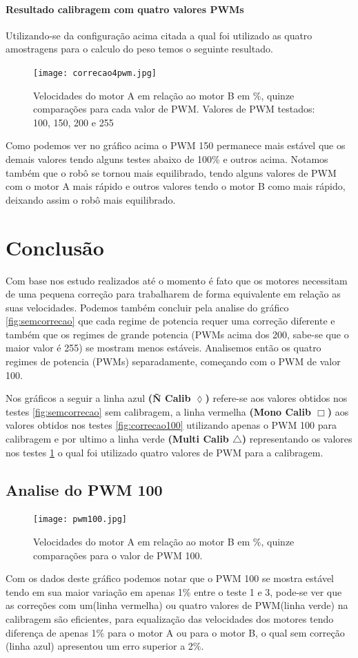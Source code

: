\documentclass[a4paper,12pt,portuguese]{ufms-cpcx}
\begin{document}
\subsubsection{Resultado calibragem com quatro valores PWMs}
Utilizando-se da configuração acima citada a qual foi utilizado as quatro amostragens para o calculo do peso temos o seguinte resultado.
\begin{figure}[H]	
	\centering
	\texttt{[image: correcao4pwm.jpg]}
	\caption{Velocidades do motor A em relação ao motor B em \%, quinze comparações para cada valor de PWM. Valores de PWM testados: 100, 150, 200 e 255}
	\label{fig:correcao4pwm}
\end{figure}
Como podemos ver no gráfico acima o PWM 150 permanece mais estável que os demais valores tendo alguns testes abaixo de 100\% e outros acima. Notamos também que o robô se tornou mais equilibrado, tendo alguns valores de PWM com o motor A mais rápido e outros valores tendo o motor B como mais rápido, deixando assim o robô mais equilibrado.

\chapter{Conclusão}
Com base nos estudo realizados até o momento é fato que os motores necessitam de uma pequena correção para trabalharem de forma equivalente em relação as suas velocidades. Podemos também concluir pela analise do gráfico \ref{fig:semcorrecao} que cada regime de potencia requer uma correção diferente e também que os regimes de grande potencia (PWMs acima dos 200, sabe-se que o maior valor é 255) se mostram menos estáveis. Analisemos então os quatro regimes de potencia (PWMs) separadamente, começando com o PWM de valor 100.

Nos gráficos a seguir a linha azul \textbf{(Ñ Calib $\lozenge$)} refere-se aos valores obtidos nos testes \ref{fig:semcorrecao} sem calibragem, a linha vermelha \textbf{(Mono Calib $\Box$)} aos valores obtidos nos testes \ref{fig:correcao100} utilizando apenas o PWM 100 para calibragem e por ultimo a linha verde \textbf{(Multi Calib $\triangle$)} representando os valores nos testes \ref{fig:correcao4pwm} o qual foi utilizado quatro valores de PWM para a calibragem.

\section{Analise do PWM 100}\label{pwm100}
\begin{figure}[H]	
	\centering
	\texttt{[image: pwm100.jpg]}
	\caption{Velocidades do motor A em relação ao motor B em \%, quinze comparações para o valor de PWM 100.}
	\label{fig:pwm100}
\end{figure}
Com os dados deste gráfico podemos notar que o PWM 100 se mostra estável tendo em sua maior variação em apenas 1\% entre o teste 1 e 3, pode-se ver que as correções com um(linha vermelha) ou quatro valores de PWM(linha verde) na calibragem são eficientes, para equalização das velocidades dos motores tendo diferença de apenas 1\% para o motor A ou para o motor B, o qual sem correção (linha azul) apresentou um erro superior a 2\%.
\end{document}
